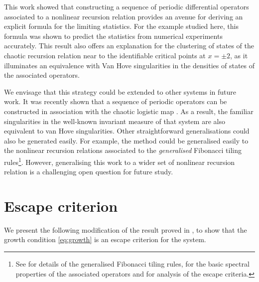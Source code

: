 \documentclass[nofootinbib,prb,amsmath,amssymb,twocolumn,floatfix]{revtex4-2}
\theoremstyle{definition}
\begin{document}
This work showed that constructing a sequence of periodic differential operators associated to a nonlinear recursion relation provides an avenue for deriving an explicit formula for the limiting statistics. For the example studied here, this formula was shown to predict the statistics from numerical experiments accurately. This result also offers an explanation for the clustering of states of the chaotic recursion relation near to the identifiable critical points at $x=\pm2$, as it illuminates an equivalence with Van Hove singularities in the densities of states of the associated operators.


We envisage that this strategy could be extended to other systems in future work. It was recently shown that a sequence of periodic operators can be constructed in association with the chaotic logistic map \cite{davies2024spectral}. As a result, the familiar singularities in the well-known invariant measure of that system \cite{jakobson1981absolutely, sethna2021statistical} are also equivalent to van Hove singularities. Other straightforward generalisations could also be generated easily. For example, the method could be generalised easily to the nonlinear recursion relations associated to the \emph{generalised} Fibonacci tiling rules\footnote{See \cite{kola1990one} for details of the generalised Fibonacci tiling rules, \cite{gumbs1988dynamical, gumbs1988scaling, gumbs1989electronic} for the basic spectral properties of the associated operators and \cite{davies2023super} for analysis of the escape criteria.}. However, generalising this work to a wider set of nonlinear recursion relation is a challenging open question for future study. 
 





\appendix
\section{Escape criterion} \label{app:escape}

We present the following modification of the result proved in \cite[Theorem 3.1]{davies2023super}, to show that the growth condition \eqref{eq:growth} is an escape criterion for the system.
\end{document}
